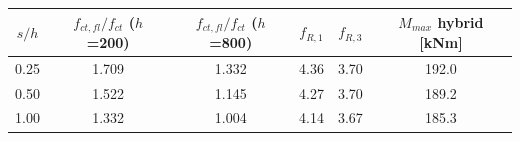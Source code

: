 \begin{tabular}{c cc cc c}
\toprule
$s/h$ & $f_{ct,fl}/f_{ct}$ ($h$=200) & $f_{ct,fl}/f_{ct}$ ($h$=800) & $f_{R,1}$ & $f_{R,3}$ & $M_{max}$ hybrid [kNm]\\
\midrule
0.25 & 1.709 & 1.332 & 4.36 & 3.70 & 192.0\\
0.50 & 1.522 & 1.145 & 4.27 & 3.70 & 189.2\\
1.00 & 1.332 & 1.004 & 4.14 & 3.67 & 185.3\\
\bottomrule
\end{tabular}
